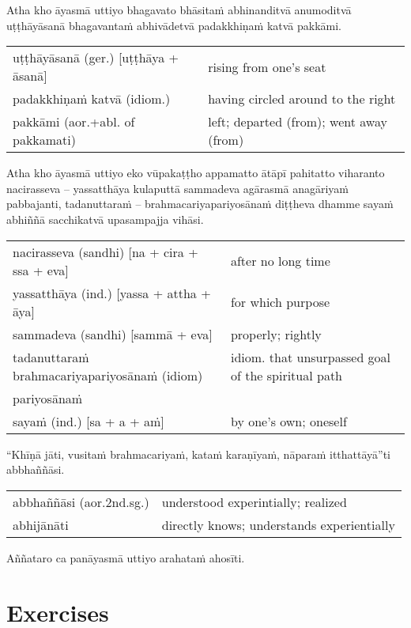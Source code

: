 \documentclass[11pt,oneside]{memoir}
\begin{document}
Atha kho āyasmā uttiyo bhagavato bhāsitaṁ abhinanditvā anumoditvā uṭṭhāyāsanā
bhagavantaṁ abhivādetvā padakkhiṇaṁ katvā pakkāmi.

\begin{longtable}{L{\colOne} L{\colTwo}}
uṭṭhāyāsanā (ger.) [uṭṭhāya + āsanā] & rising from one's seat\\[0pt]
padakkhiṇaṁ katvā (idiom.) & having circled around to the right\\[0pt]
pakkāmi (aor.+abl. of pakkamati) & left; departed (from); went away (from)\\[0pt]
\end{longtable}

\clearpage

Atha kho āyasmā uttiyo eko vūpakaṭṭho appamatto ātāpī pahitatto viharanto
nacirasseva -- yassatthāya kulaputtā sammadeva agārasmā anagāriyaṁ pabbajanti,
tadanuttaraṁ -- brahmacariyapariyosānaṁ diṭṭheva dhamme sayaṁ abhiññā sacchikatvā
upasampajja vihāsi.

\begin{longtable}{L{\colOne} L{\colTwo}}
nacirasseva (sandhi) [na + cira + ssa + eva] & after no long time\\[0pt]
yassatthāya (ind.) [yassa + attha + āya] & for which purpose\\[0pt]
sammadeva (sandhi) [sammā + eva] & properly; rightly\\[0pt]
tadanuttaraṁ brahmacariyapariyosānaṁ (idiom) & idiom. that unsurpassed goal of the spiritual path\\[0pt]
pariyosānaṁ & \\[0pt]
sayaṁ (ind.) [sa + a + aṁ] & by one's own; oneself\\[0pt]
\end{longtable}

“Khīṇā jāti, vusitaṁ brahmacariyaṁ, kataṁ karaṇīyaṁ, nāparaṁ itthattāyā”ti abbhaññāsi.

\begin{longtable}{L{\colOne} L{\colTwo}}
abbhaññāsi (aor.2nd.sg.) & understood experintially; realized\\[0pt]
abhijānāti & directly knows; understands experientially\\[0pt]
\end{longtable}

Aññataro ca panāyasmā uttiyo arahataṁ ahosīti.

\clearpage

\section{Exercises}
\label{sec:orgf8cd684}
\end{document}
